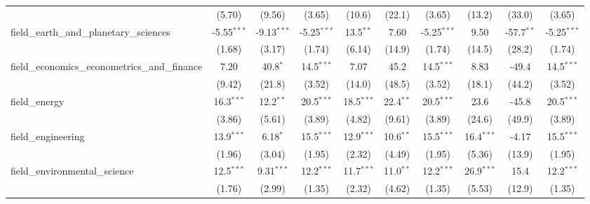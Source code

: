 \begin{tabular}{lccccccccc}
                                                               & (5.70)        & (9.56)        & (3.65)        & (10.6)       & (22.1)        & (3.65)        & (13.2)        & (33.0)         & (3.65)\\   
   field\_earth\_and\_planetary\_sciences                      & -5.55$^{***}$ & -9.13$^{***}$ & -5.25$^{***}$ & 13.5$^{**}$  & 7.60          & -5.25$^{***}$ & 9.50          & -57.7$^{**}$   & -5.25$^{***}$\\   
                                                               & (1.68)        & (3.17)        & (1.74)        & (6.14)       & (14.9)        & (1.74)        & (14.5)        & (28.2)         & (1.74)\\   
   field\_economics\_econometrics\_and\_finance                & 7.20          & 40.8$^{*}$    & 14.5$^{***}$  & 7.07         & 45.2          & 14.5$^{***}$  & 8.83          & -49.4          & 14.5$^{***}$\\   
                                                               & (9.42)        & (21.8)        & (3.52)        & (14.0)       & (48.5)        & (3.52)        & (18.1)        & (44.2)         & (3.52)\\   
   field\_energy                                               & 16.3$^{***}$  & 12.2$^{**}$   & 20.5$^{***}$  & 18.5$^{***}$ & 22.4$^{**}$   & 20.5$^{***}$  & 23.6          & -45.8          & 20.5$^{***}$\\   
                                                               & (3.86)        & (5.61)        & (3.89)        & (4.82)       & (9.61)        & (3.89)        & (24.6)        & (49.9)         & (3.89)\\   
   field\_engineering                                          & 13.9$^{***}$  & 6.18$^{*}$    & 15.5$^{***}$  & 12.9$^{***}$ & 10.6$^{**}$   & 15.5$^{***}$  & 16.4$^{***}$  & -4.17          & 15.5$^{***}$\\   
                                                               & (1.96)        & (3.04)        & (1.95)        & (2.32)       & (4.49)        & (1.95)        & (5.36)        & (13.9)         & (1.95)\\   
   field\_environmental\_science                               & 12.5$^{***}$  & 9.31$^{***}$  & 12.2$^{***}$  & 11.7$^{***}$ & 11.0$^{**}$   & 12.2$^{***}$  & 26.9$^{***}$  & 15.4           & 12.2$^{***}$\\   
                                                               & (1.76)        & (2.99)        & (1.35)        & (2.32)       & (4.62)        & (1.35)        & (5.53)        & (12.9)         & (1.35)\\   

\end{tabular}
